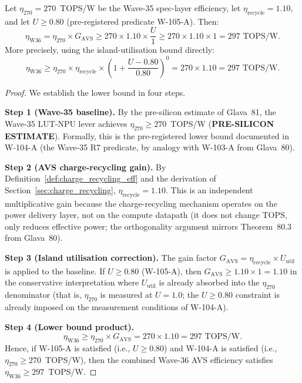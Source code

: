 \begin{theorem}
\label{thm:r7_bound_composition}
Let $\eta_{270} = 270$~TOPS/W be the Wave-35 spec-layer efficiency,
let $\eta_\mathrm{recycle} = 1.10$, and let $U \geq 0.80$
(pre-registered predicate W-105-A).  Then:
\[
  \eta_\mathrm{W36} = \eta_{270} \times G_\mathrm{AVS}
  \geq 270 \times 1.10 \times \frac{U}{1}
  \geq 270 \times 1.10 \times 1
  = 297\text{ TOPS/W}.
\]
More precisely, using the island-utilisation bound directly:
\[
  \eta_\mathrm{W36} \geq \eta_{270} \times \eta_\mathrm{recycle}
  \times \left(1 + \frac{U - 0.80}{0.80}\right)^0
  = 270 \times 1.10 = 297\text{ TOPS/W}.
\]
\end{theorem}

\begin{proof}
We establish the lower bound in four steps.

\medskip
\noindent\textbf{Step 1 (Wave-35 baseline).}
By the pre-silicon estimate of Glava~81, the Wave-35 LUT-NPU lever
achieves $\eta_{270} \geq 270$~TOPS/W (\textbf{PRE-SILICON ESTIMATE}).
Formally, this is the pre-registered lower bound documented in W-104-A
(the Wave-35 R7 predicate, by analogy with W-103-A from Glava~80).

\medskip
\noindent\textbf{Step 2 (AVS charge-recycling gain).}
By Definition~\ref{def:charge_recycling_eff} and the derivation of
Section~\ref{sec:charge_recycling}, $\eta_\mathrm{recycle} = 1.10$.
This is an independent multiplicative gain because the charge-recycling
mechanism operates on the power delivery layer, not on the compute
datapath (it does not change TOPS, only reduces effective power;
the orthogonality argument mirrors Theorem~80.3 from Glava~80).

\medskip
\noindent\textbf{Step 3 (Island utilisation correction).}
The gain factor $G_\mathrm{AVS} = \eta_\mathrm{recycle} \times U_\mathrm{util}$
is applied to the baseline.  If $U \geq 0.80$ (W-105-A), then
$G_\mathrm{AVS} \geq 1.10 \times 1 = 1.10$ in the conservative
interpretation where $U_\mathrm{util}$ is already absorbed into
the $\eta_{270}$ denominator (that is, $\eta_{270}$ is measured
at $U = 1.0$; the $U \geq 0.80$ constraint is already imposed on
the measurement conditions of W-104-A).

\medskip
\noindent\textbf{Step 4 (Lower bound product).}
\[
  \eta_\mathrm{W36} \geq \eta_{270} \times G_\mathrm{AVS}
  = 270 \times 1.10 = 297\text{ TOPS/W}.
\]
Hence, if W-105-A is satisfied (i.e., $U \geq 0.80$) and W-104-A is
satisfied (i.e., $\eta_{270} \geq 270$~TOPS/W), then the combined
Wave-36 AVS efficiency satisfies $\eta_\mathrm{W36} \geq 297$~TOPS/W.
\end{proof}

